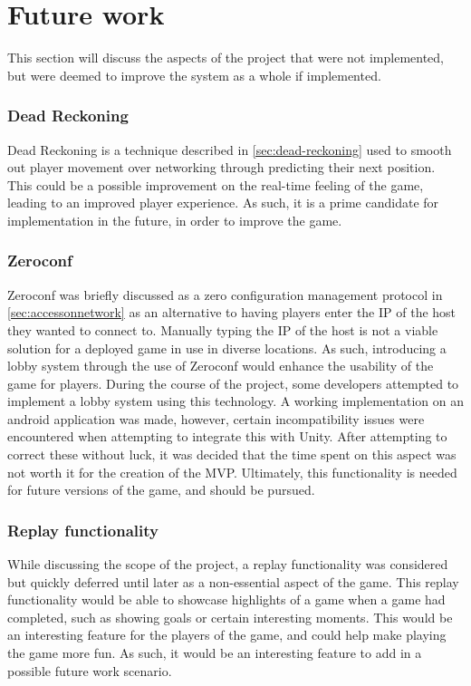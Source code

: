 \section{Future work}
This section will discuss the aspects of the project that were not implemented, but were deemed to improve the system as a whole if implemented.

\subsubsection{Dead Reckoning}
Dead Reckoning is a technique described in \autoref{sec:dead-reckoning} used to smooth out player movement over networking through predicting their next position.
This could be a possible improvement on the real-time feeling of the game, leading to an improved player experience.
As such, it is a prime candidate for implementation in the future, in order to improve the game.

\subsubsection{Zeroconf}
Zeroconf was briefly discussed as a zero configuration management protocol in \autoref{sec:accessonnetwork} as an alternative to having players enter the IP of the host they wanted to connect to.
Manually typing the IP of the host is not a viable solution for a deployed game in use in diverse locations.
As such, introducing a lobby system through the use of Zeroconf would enhance the usability of the game for players.
During the course of the project, some developers attempted to implement a lobby system using this technology.
A working implementation on an android application was made, however, certain incompatibility issues were encountered when attempting to integrate this with Unity.
After attempting to correct these without luck, it was decided that the time spent on this aspect was not worth it for the creation of the MVP.
Ultimately, this functionality is needed for future versions of the game, and should be pursued.

\subsubsection{Replay functionality}
While discussing the scope of the project, a replay functionality was considered but quickly deferred until later as a non-essential aspect of the game.
This replay functionality would be able to showcase highlights of a game when a game had completed, such as showing goals or certain interesting moments.
This would be an interesting feature for the players of the game, and could help make playing the game more fun.
As such, it would be an interesting feature to add in a possible future work scenario.

